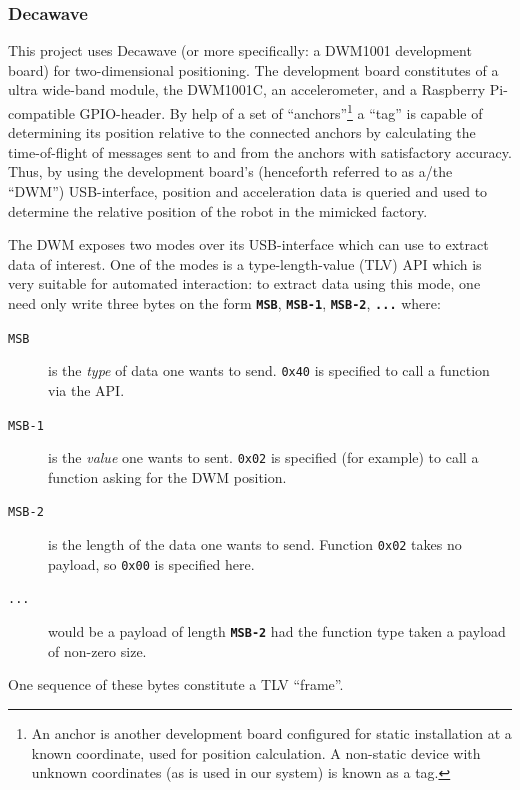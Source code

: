 \subsubsection{Decawave}
This project uses Decawave (or more specifically: a DWM1001 development board) for two-dimensional positioning.
The development board constitutes of a ultra wide-band module, the DWM1001C, an accelerometer,
and a Raspberry Pi-compatible GPIO-header.
By help of a set of ``anchors''\footnote{An anchor is another development board configured for static installation at a known coordinate, used for position calculation. A non-static device with unknown coordinates (as is used in our system) is known as a tag.} a ``tag'' is capable of determining its position relative to the connected anchors by calculating the time-of-flight of messages sent to and from the anchors with satisfactory accuracy.
Thus, by using the development board's (henceforth referred to as a/the ``DWM'') USB-interface,
position and acceleration data is queried and used to determine the relative position of the robot in the mimicked factory.

The DWM  exposes two modes over its USB-interface which can use to extract data of interest.
One of the modes is a type-length-value (TLV) API which is very suitable for automated interaction:
to extract data using this mode, one need only write three bytes on the form \texttt{\textbf{MSB}}, \texttt{\textbf{MSB-1}}, \texttt{\textbf{MSB-2}}, \texttt{\textbf{...}} where:
\begin{description}
\item[\texttt{MSB}] is the \textit{type} of data one wants to send. \texttt{0x40} is specified to call a function via the API.
\item[\texttt{MSB-1}] is the \textit{value} one wants to sent. \texttt{0x02} is specified (for example) to call a function asking for the DWM position.
\item[\texttt{MSB-2}] is the length of the data one wants to send. Function \texttt{0x02} takes no payload, so \texttt{0x00} is specified here.
\item[\texttt{...}] would be a payload of length \texttt{\textbf{MSB-2}} had the function type taken a payload of non-zero size.
\end{description}
One sequence of these bytes constitute a TLV ``frame''.

